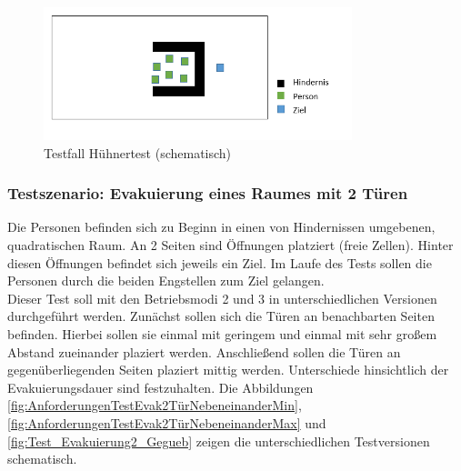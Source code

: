 \begin{figure}[htpb]
	\centering
	\includegraphics[width=0.8\textwidth]{abbildungen/Test_Huehner.png}
	\caption{Testfall Hühnertest (schematisch)}
	\label{fig:AnforderungenTest_Hühner}
\end{figure}
 
\subsubsection{Testszenario: Evakuierung eines Raumes mit 2 Türen}
\label{Anforderungen:Evakuierung2}
Die Personen befinden sich zu Beginn in einen von Hindernissen umgebenen, quadratischen Raum. An 2 Seiten sind Öffnungen platziert (freie Zellen). Hinter diesen Öffnungen befindet sich jeweils ein Ziel. Im Laufe des Tests sollen die Personen durch die beiden Engstellen zum Ziel gelangen. \\
Dieser Test soll mit den Betriebsmodi 2 und 3 in unterschiedlichen Versionen durchgeführt werden. Zunächst sollen sich die Türen an benachbarten Seiten befinden. Hierbei sollen sie einmal mit geringem und einmal mit sehr großem Abstand zueinander plaziert werden. Anschließend sollen die Türen an gegenüberliegenden Seiten plaziert mittig werden. Unterschiede hinsichtlich der Evakuierungsdauer sind festzuhalten. Die Abbildungen \ref{fig:AnforderungenTestEvak2TürNebeneinanderMin},  \ref{fig:AnforderungenTestEvak2TürNebeneinanderMax} und  \ref{fig:Test_Evakuierung2_Gegueb} zeigen die unterschiedlichen Testversionen schematisch.

